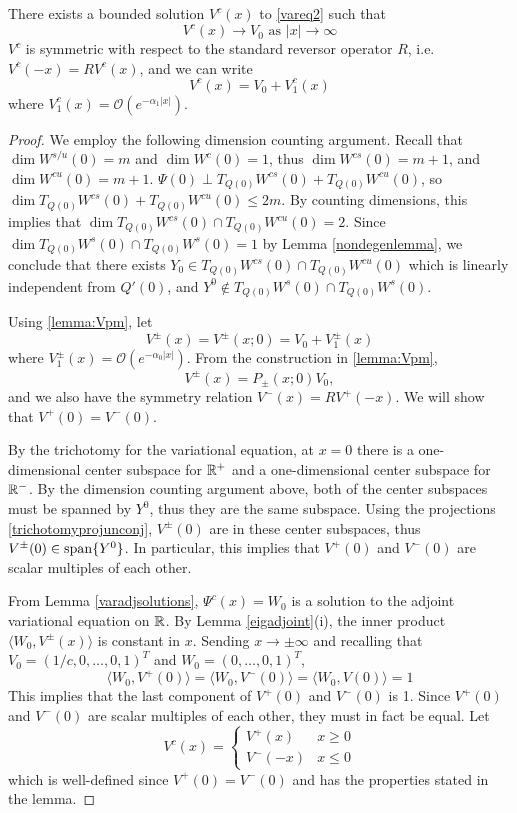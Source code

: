 \documentclass[thesis.tex]{subfiles}
\begin{document}
\begin{lemma}\label{lemma:Vcexists}
There exists a bounded solution $V^c(x)$ to \eqref{vareq2} such that 
\begin{equation*}
V^c(x) \rightarrow V_0 \text{ as }|x| \rightarrow \infty
\end{equation*}
$V^c$ is symmetric with respect to the standard reversor operator $R$, i.e. $V^c(-x) = R V^c(x)$, and we can write
\[
V^c(x) = V_0 + V^c_1(x)
\]
where $V^c_1(x) = \mathcal{O}(e^{-\alpha_1 |x|})$.
\begin{proof}
We employ the following dimension counting argument. Recall that $\dim W^{s/u}(0) = m$ and $\dim W^c(0) = 1$, thus $\dim W^{cs}(0) = m + 1$, and $\dim W^{cu}(0) = m + 1$. $\Psi(0) \perp T_{Q(0)}W^{cs}(0) + T_{Q(0)}W^{cu}(0)$, so $\dim T_{Q(0)}W^{cs}(0) + T_{Q(0)}W^{cu}(0) \leq 2m$. By counting dimensions, this implies that $\dim T_{Q(0)}W^{cs}(0) \cap T_{Q(0)}W^{cu}(0) = 2$. Since $\dim T_{Q(0)}W^s(0) \cap T_{Q(0)}W^s(0) = 1$ by Lemma \ref{nondegenlemma}, we conclude that there exists $Y_0 \in T_{Q(0)}W^{cs}(0) \cap T_{Q(0)}W^{cu}(0)$ which is linearly independent from $Q'(0)$, and $Y^0 \notin T_{Q(0)}W^s(0) \cap T_{Q(0)}W^s(0)$.

Using \cref{lemma:Vpm}, let
\[
V^\pm(x) = V^\pm(x; 0) = V_0 + V_1^\pm(x)
\]
where $V_1^\pm(x) = \mathcal{O}(e^{-\alpha_0 |x|})$. From the construction in \cref{lemma:Vpm},
\[
V^\pm(x) = P_\pm(x; 0) V_0,
\]
and we also have the symmetry relation $V^-(x) = R V^+(-x)$. We will show that $V^+(0) = V^-(0)$.

By the trichotomy for the variational equation, at $x = 0$ there is a one-dimensional center subspace for $\mathbb{R}^+$ and a one-dimensional center subspace for $\mathbb{R}^-$. By the dimension counting argument above, both of the center subspaces must be spanned by $Y^0$, thus they are the same subspace. Using the projections \eqref{trichotomyprojunconj}, $V^\pm(0)$ are in these center subspaces, thus $V^\pm(0) \in \mathop\mathrm{span}\nolimits \{Y^0 \}$. In particular, this implies that $V^+(0)$ and $V^-(0)$ are scalar multiples of each other. 

From Lemma \ref{varadjsolutions}, $\Psi^c(x) = W_0$ is a solution to the adjoint variational equation on $\mathbb{R}$. By Lemma \ref{eigadjoint}(i), the inner product $\langle W_0, V^\pm(x) \rangle$ is constant in $x$. Sending $x \rightarrow \pm \infty$ and recalling that $V_0 = (1/c, 0, \dots, 0, 1)^T $ and $W_0 = (0, \dots, 0, 1)^T$,
\[
\langle W_0, V^+(0) \rangle = \langle W_0, V^-(0) \rangle
= \langle W_0, V(0) \rangle = 1
\]
This implies that the last component of $V^+(0)$ and $V^-(0)$ is 1. Since $V^+(0)$ and $V^-(0)$ are scalar multiples of each other, they must in fact be equal. Let
\[
V^c(x) = \begin{cases}
V^+(x) & x \geq 0 \\
V^-(-x) & x \leq 0 
\end{cases}
\]
which is well-defined since $V^+(0) = V^-(0)$ and has the properties stated in the lemma.
\end{proof}
\end{lemma}
\end{document}
